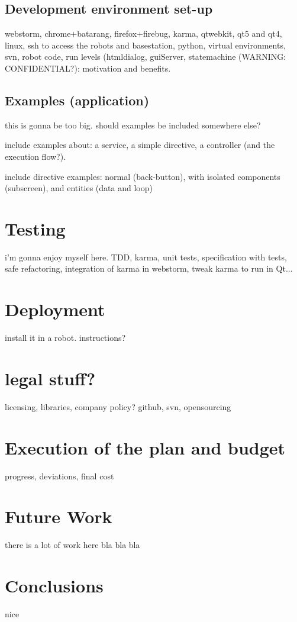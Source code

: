 \section{Development environment set-up}
webstorm, chrome+batarang, firefox+firebug, karma, qtwebkit, qt5 and qt4, linux, ssh to access the robots and basestation, python, virtual environments, svn, robot code, run levels (htmldialog, guiServer, statemachine (WARNING: CONFIDENTIAL?): motivation and benefits.

\section{Examples (application)}
this is gonna be too big. should examples be included somewhere else?

include examples about: a service, a simple directive, a controller (and the execution flow?).

include directive examples: normal (back-button), with isolated components (subscreen), and entities (data and loop)

\chapter{Testing}
i'm gonna enjoy myself here.
TDD, karma, unit tests, specification with tests, safe refactoring, integration of karma in webstorm, tweak karma to run in Qt...

\chapter{Deployment}
install it in a robot. instructions?

\chapter{legal stuff?}
licensing, libraries, company policy? github, svn, opensourcing

\chapter{Execution of the plan and budget}
progress, deviations, final cost

\chapter{Future Work}
there is a lot of work here bla bla bla

\chapter{Conclusions}
nice
